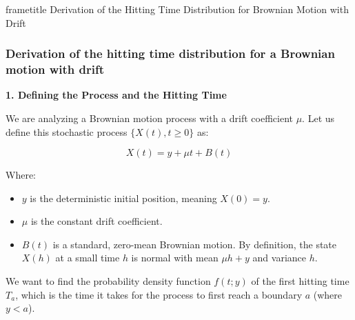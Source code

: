 \documentclass{beamer}
\begin{document}
\begin{frame}
\begin{beamercolorbox}[wd=\paperwidth,sep=0.3cm,center]{frametitle}
Derivation of the Hitting Time Distribution for Brownian Motion with Drift
\end{beamercolorbox}
\end{frame}

\begin{frame}
\frametitle{Derivation of the hitting time distribution for a Brownian motion with drift}
\textbf{1. Defining the Process and the Hitting Time}

We are analyzing a Brownian motion process with a drift coefficient $\mu$. Let us define this stochastic process $\{X(t), t \geq 0\}$ as:

\[
X(t) = y + \mu t + B(t)
\]

Where:

\begin{itemize}
  \item $y$ is the deterministic initial position, meaning $X(0) = y$.
  \item $\mu$ is the constant drift coefficient.
  \item $B(t)$ is a standard, zero-mean Brownian motion. By definition, the state $X(h)$ at a small time $h$ is normal with mean $\mu h + y$ and variance $h$.
\end{itemize}

We want to find the probability density function $f(t; y)$ of the first hitting time $T_a$, which is the time it takes for the process to first reach a boundary $a$ (where $y < a$).
\end{frame}
\end{document}
